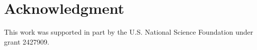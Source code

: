 \documentclass[journal, onecolumn]{IEEEtran}
\begin{document}







%







\section*{Acknowledgment}

This work was supported in part by the U.S. National Science Foundation under grant 2427909.






\ifCLASSOPTIONcaptionsoff
  \newpage
\fi
\end{document}

